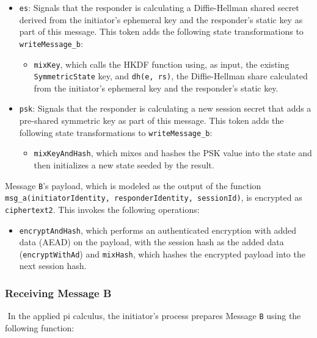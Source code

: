 \begin{itemize}
\item \texttt{es}: Signals that the responder is calculating a Diffie-Hellman shared secret derived from the initiator's ephemeral key and the responder's static key as part of this message. This token adds the following state transformations to \texttt{writeMessage\_b}:
\begin{itemize}

\item \texttt{mixKey}, which calls the HKDF function using, as input, the existing \texttt{SymmetricState} key, and \texttt{dh(e, rs)}, the Diffie-Hellman share calculated from the initiator's ephemeral key and the responder's static key.
\end{itemize}


\item \texttt{psk}: Signals that the responder is calculating a new session secret that adds a pre-shared symmetric key as part of this message. This token adds the following state transformations to \texttt{writeMessage\_b}:
\begin{itemize}

\item  \texttt{mixKeyAndHash}, which mixes and hashes the PSK value into the state and then initializes a new state seeded by the result.
\end{itemize}


\end{itemize}
Message \texttt{B}'s payload, which is modeled as the output of the function \texttt{msg\_a(initiatorIdentity, responderIdentity, sessionId)}, is encrypted as \texttt{ciphertext2}. This invokes the following operations:


\begin{itemize}

\item \texttt{encryptAndHash}, which performs an authenticated encryption with added data (AEAD) on the payload, with the session hash as the added data (\texttt{encryptWithAd}) and \texttt{mixHash}, which hashes the encrypted payload into the next session hash.

\end{itemize}
\subsubsection{Receiving Message B}$ $
In the applied pi calculus, the initiator's process prepares Message \texttt{B} using the following function:


